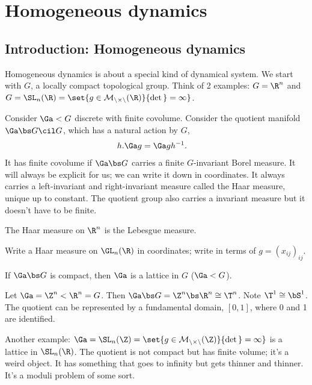 \chapter{Homogeneous dynamics}

\section{Introduction: Homogeneous dynamics}

Homogeneous dynamics is about a special kind of dynamical system. We start with $G$, a locally compact topological group. Think of 2 examples: $G=\R^n$ and $G=\SL_n(\R)=\set{g\in\cal M_{n\times n}(\R)}{\det g=1}$. 

Consider $\Ga<G$ discrete with finite covolume. Consider the quotient manifold $\Ga \bs G \cil G$, which has a natural action by $G$,
\begin{align}
h.\Ga g &=\Ga gh^{-1}.
\end{align}
It has finite covolume if $\Ga \bs G$ carries a finite $G$-invariant Borel measure. It will always be explicit for us; we can write it down in coordinates.
It always carries a left-invariant and right-invariant measure called the Haar measure, unique up to constant. The quotient group also carries a invariant measure but it doesn't have to be finite. 

The Haar measure on $\R^n$ is the Lebesgue measure.

\begin{exr} Write a Haar measure on $\GL_n(\R)$ in coordinates; write in terms of $g=(x_{ij})_{ij}$. 
\end{exr}
\begin{rem}
If $\Ga\bs G$ is compact, then $\Ga$ is a lattice in $G$ ($\Ga < G$). 
\end{rem}

\begin{ex}
Let $\Ga = \Z^n<\R^n=G$. 
Then $\Ga \bs G = \Z^n\bs \R^n\cong \T^n$.
Note $\T^1\cong \bS^1$. 
The quotient can be represented by a fundamental domain, $[0,1]$, where 0 and 1 are identified.
\end{ex}
\begin{ex}
Another example: $\Ga = \SL_n(\Z) = \set{g\in \cal M_{n\times n} (\Z)}{\det g=1}$ is a lattice in $\SL_n(\R)$.  
The quotient is not compact but has finite volume; it's a weird object. It has something that goes to infinity but gets thinner and thinner.
It's a moduli problem of some sort.
\end{ex}

